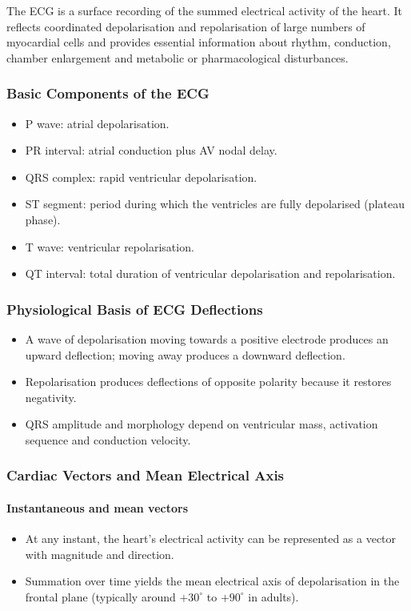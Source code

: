 \documentclass[11pt,a4paper]{article}
\begin{document}
The ECG is a surface recording of the summed electrical activity of the heart. It reflects coordinated depolarisation and repolarisation of large numbers of myocardial cells and provides essential information about rhythm, conduction, chamber enlargement and metabolic or pharmacological disturbances.

\subsubsection{Basic Components of the ECG}

\begin{itemize}
  \item P wave: atrial depolarisation.
  \item PR interval: atrial conduction plus AV nodal delay.
  \item QRS complex: rapid ventricular depolarisation.
  \item ST segment: period during which the ventricles are fully depolarised (plateau phase).
  \item T wave: ventricular repolarisation.
  \item QT interval: total duration of ventricular depolarisation and repolarisation.
\end{itemize}

\subsubsection{Physiological Basis of ECG Deflections}

\begin{itemize}
  \item A wave of depolarisation moving towards a positive electrode produces an upward deflection; moving away produces a downward deflection.
  \item Repolarisation produces deflections of opposite polarity because it restores negativity.
  \item QRS amplitude and morphology depend on ventricular mass, activation sequence and conduction velocity.
\end{itemize}

\subsubsection{Cardiac Vectors and Mean Electrical Axis}

\paragraph{Instantaneous and mean vectors}
\begin{itemize}
  \item At any instant, the heart's electrical activity can be represented as a vector with magnitude and direction.
  \item Summation over time yields the mean electrical axis of depolarisation in the frontal plane (typically around $+30^\circ$ to $+90^\circ$ in adults).
\end{itemize}
\end{document}
